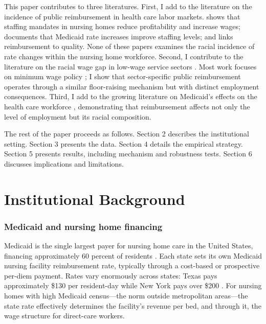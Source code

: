 \documentclass[12pt]{article}
\begin{document}
This paper contributes to three literatures. First, I add to the literature on the incidence of public reimbursement in health care labor markets. \citet{Hackmann2019} shows that staffing mandates in nursing homes reduce profitability and increase wages; \citet{Grabowski2004} documents that Medicaid rate increases improve staffing levels; and \citet{Werner2012} links reimbursement to quality. None of these papers examines the racial incidence of rate changes within the nursing home workforce. Second, I contribute to the literature on the racial wage gap in low-wage service sectors \citep{Blau2017, Cajner2017}. Most work focuses on minimum wage policy \citep{Derenoncourt2021}; I show that sector-specific public reimbursement operates through a similar floor-raising mechanism but with distinct employment consequences. Third, I add to the growing literature on Medicaid's effects on the health care workforce \citep{Chen2016, Garthwaite2012, Duggan2000}, demonstrating that reimbursement affects not only the level of employment but its racial composition.

The rest of the paper proceeds as follows. Section 2 describes the institutional setting. Section 3 presents the data. Section 4 details the empirical strategy. Section 5 presents results, including mechanism and robustness tests. Section 6 discusses implications and limitations.

\section{Institutional Background}

\subsubsection*{Medicaid and nursing home financing}  Medicaid is the single largest payer for nursing home care in the United States, financing approximately 60 percent of residents \citep{MACPAC2023}. Each state sets its own Medicaid nursing facility reimbursement rate, typically through a cost-based or prospective per-diem payment. Rates vary enormously across states: Texas pays approximately \$130 per resident-day while New York pays over \$200 \citep{KFF2023}. For nursing homes with high Medicaid census---the norm outside metropolitan areas---the state rate effectively determines the facility's revenue per bed, and through it, the wage structure for direct-care workers.
\end{document}
